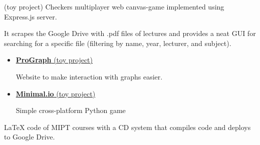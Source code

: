 
{\href{https://github.com/AlexFreik/Checkers-in-Delft}
{}}
   (toy project) Checkers multiplayer web canvas-game implemented using 
   Express.js server.  
\divider

{\href{https://github.com/mipt-ltc/mipt-ltc.github.io}
{}}
It scrapes the Google Drive with .pdf files of lectures and provides a neat GUI for searching for a specific file (filtering by name, year, lecturer, and subject).
    
\divider

{\href{https://github.com/Unicorn-Dev}{}}
\begin{itemize}
    \item \href{https://github.com/Unicorn-Dev/ProGraph}
        {\textbf{ProGraph} (toy project)}

    Website to make interaction with graphs easier.

    \item \href{https://github.com/Unicorn-Dev/Minimal.io}
        {\textbf{Minimal.io} (toy project)}

    Simple cross-platform Python game

\end{itemize}
\divider


{\href{https://github.com/MIPT-Group/Lectures_Tex_Club}
{}}
LaTeX code of MIPT courses with a CD system that compiles code and deploys to Google Drive.
